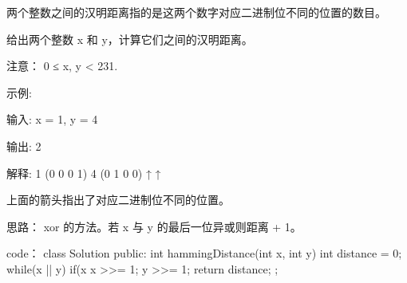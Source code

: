 两个整数之间的汉明距离指的是这两个数字对应二进制位不同的位置的数目。

给出两个整数 x 和 y，计算它们之间的汉明距离。

注意：
0 ≤ x, y < 231.

示例:

输入: x = 1, y = 4

输出: 2

解释:
1   (0 0 0 1)
4   (0 1 0 0)
       ↑   ↑

上面的箭头指出了对应二进制位不同的位置。

























思路：
xor 的方法。若 x 与 y 的最后一位异或则距离 + 1。

























code：
class Solution {
public:
    int hammingDistance(int x, int y) {
        int distance = 0;
        while(x || y)
        {
            if(x %
            x >>= 1;
            y >>= 1;
        }
        return distance;
    }
};